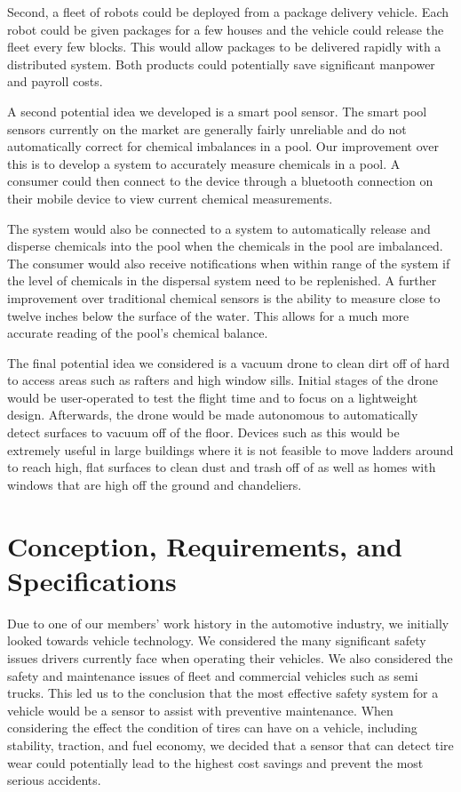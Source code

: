 \documentclass[11pt]{IEEEtran}
\begin{document}
		Second, a fleet of robots could be deployed from a package delivery vehicle. Each robot could be given packages for a few houses and the vehicle could release the fleet every few blocks. This would allow packages to be delivered rapidly with a distributed system. Both products could potentially save significant manpower and payroll costs. 

		A second potential idea we developed is a smart pool sensor. The smart pool sensors currently on the market are generally fairly unreliable and do not automatically correct for chemical imbalances in a pool. Our improvement over this is to develop a system to accurately measure chemicals in a pool. A consumer could then connect to the device through a bluetooth connection on their mobile device to view current chemical measurements. 

		The system would also be connected to a system to automatically release and disperse chemicals into the pool when the chemicals in the pool are imbalanced. The consumer would also receive notifications when within range of the system if the level of chemicals in the dispersal system need to be replenished. A further improvement over traditional chemical sensors is the ability to measure close to twelve inches below the surface of the water. This allows for a much more accurate reading of the pool’s chemical balance.

		The final potential idea we considered is a vacuum drone to clean dirt off of hard to access areas such as rafters and high window sills. Initial stages of the drone would be user-operated to test the flight time and to focus on a lightweight design. Afterwards, the drone would be made autonomous to automatically detect surfaces to vacuum off of the floor. Devices such as this would be extremely useful in large buildings where it is not feasible to move ladders around to reach high, flat surfaces to clean dust and trash off of as well as homes with windows that are high off the ground and chandeliers. 


	\section{Conception, Requirements, and Specifications}
		Due to one of our members’ work history in the automotive industry, we initially looked towards vehicle technology. We considered the many significant safety issues drivers currently face when operating their vehicles. We also considered the safety and maintenance issues of fleet and commercial vehicles such as semi trucks. This led us to the conclusion that the most effective safety system for a vehicle would be a sensor to assist with preventive maintenance. When considering the effect the condition of tires can have on a vehicle, including stability, traction, and fuel economy, we decided that a sensor that can detect tire wear could potentially lead to the highest cost savings and prevent the most serious accidents. 
\end{document}
